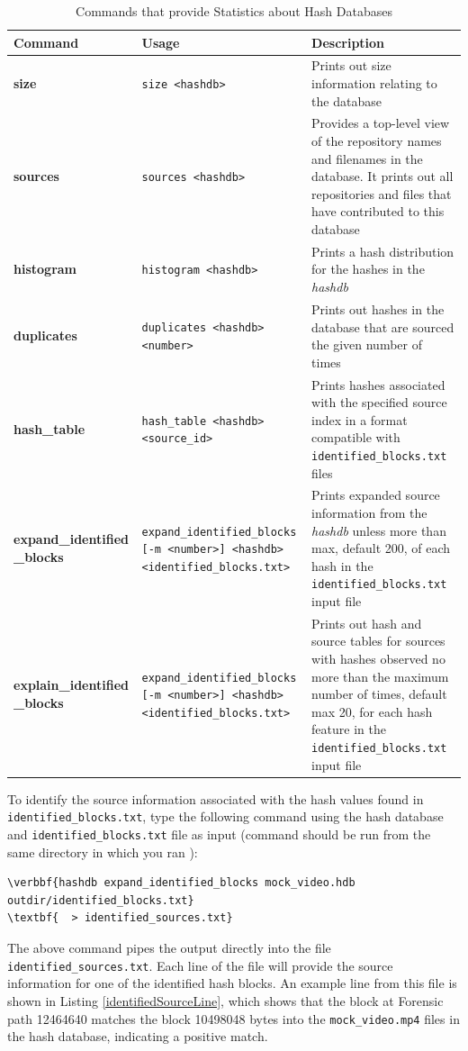 \documentclass[11pt,fleqn]{article} %
\begin{document}
\begin{table}[!ht]
\centering
\caption{Commands that provide Statistics about Hash Databases}
\label{tab:statistics}
\begin{tabular}{|p{3.5 cm}|p{6 cm}|p{4 cm}|}
\hline \hline
\textbf{Command} & \textbf{Usage} & \textbf{Description} \\
\hline
\textbf{size} & \verb+size <hashdb>+ & Prints out size information relating to the database\\
\hline
\textbf{sources} & \verb+sources <hashdb>+ & Provides a top-level view of the repository names and filenames in the database. It prints out all repositories and files that have contributed to this database\\
\hline
\textbf{histogram} & \verb+histogram <hashdb>+ &  Prints a hash distribution for the hashes in the \textit{hashdb}\\
\hline
\textbf{duplicates} & \verb+duplicates <hashdb> <number>+ &  Prints out hashes in the database that are sourced the given number of times\\
\hline
\textbf{hash\_table} & \verb+hash_table <hashdb> <source_id>+ &  Prints hashes associated with the specified source index in a format compatible with \texttt{identified\_blocks.txt} files\\
\hline
\textbf{expand\_identified} \textbf{\_blocks} & \verb+expand_identified_blocks+ \verb+[-m <number>] <hashdb>+ \verb+<identified_blocks.txt>+ & Prints expanded source information from the \textit{hashdb} unless more than max, default 200, of each hash in the \texttt{identified\_blocks.txt} input file\\
\hline
\textbf{explain\_identified} \textbf{\_blocks} & \verb+expand_identified_blocks+ \verb+[-m <number>] <hashdb>+ \verb+<identified_blocks.txt>+ & Prints out hash and source tables for sources with hashes observed no more than the maximum number of times, default max 20, for each hash feature in the \texttt{identified\_blocks.txt} input file\\
\hline
\end{tabular}
\end{table}

To identify the source information associated with the hash values found in \texttt{identified\_blocks.txt}, type the following command using the hash database and \texttt{identified\_blocks.txt} file as input (command should be run from the same directory in which you ran \bulk):
\begin{Verbatim}[commandchars=\\\{\}]
\verbbf{hashdb expand_identified_blocks mock_video.hdb outdir/identified_blocks.txt} 
\textbf{  > identified_sources.txt}
\end{Verbatim}
The above command pipes the output directly into the file \texttt{identified\_sources.txt}. Each line of the file will provide the source information for one of the identified hash blocks. An example line from this file is shown in Listing \ref{identifiedSourceLine},
which shows that the block at Forensic path 12464640 matches the block 10498048 bytes into the \texttt{mock\_video.mp4} files in the hash database, indicating a positive match.\\
\end{document}
